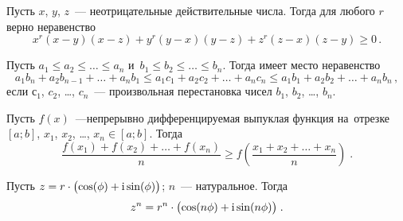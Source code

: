 Пусть $x$, $y$, $z$~--- неотрицательные действительные числа.
Тогда для любого $r$ верно неравенство
\[
    x^{r} (x - y) (x - z) + y^{r} (y - x) (y - z) + z^{r} (z - x) (z - y)
\geq
    0
\, . \]

Пусть $a_{1} \leq a_{2} \leq \ldots \leq a_{n}$
и~$b_{1} \leq b_{2} \leq \ldots \leq b_{n}$.
Тогда имеет место неравенство
\[
    a_{1} b_{n} + a_{2} b_{n-1} + \ldots + a_{n} b_{1}
\leq
    a_{1} c_{1} + a_{2} c_{2} + \ldots + a_{n} c_{n}
\leq
    a_{1} b_{1} + a_{2} b_{2} + \ldots + a_{n} b_{n}
\, , \]
если $с_{1}$, $c_{2}$, \ldots, $c_{n}$~--- произвольная перестановка
чисел $b_{1}$, $b_{2}$, \ldots, $b_{n}$.

Пусть $f(x)$~---непрерывно дифференцируемая выпуклая функция
на~отрезке $[a; b]$,
$x_{1}$, $x_{2}$, \ldots, $x_{n} \in [a; b]$.
Тогда
\[
    \frac{
        f(x_{1}) + f(x_{2}) + \ldots + f(x_{n})
    }{n}
\geq
    f\left(
        \frac{x_{1} + x_{2} + \ldots + x_{n}}{n}
    \right)
\; . \]

Пусть
\(
    z
=
    r \cdot
    \bigl( \cos(\phi) + \mathrm{i} \sin(\phi) \bigr)
\);
$n$~--- натуральное.
Тогда
\[
    z^{n}
=
    r^{n} \cdot
    \bigl( \cos(n \phi) + \mathrm{i} \sin(n \phi) \bigr)
\; . \]

\endgroup %

